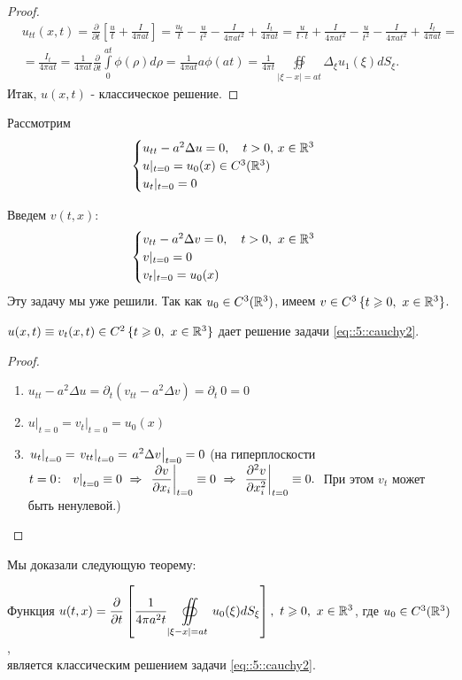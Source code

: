 \documentclass[../main.tex]{subfiles}
\begin{document}
\begin{proof}
\begin{equation*}
\begin{split}
&u_{tt}(x, t)=\frac{\partial}{\partial t}\left[\frac{u}{t}+\frac{I}{4\pi at} \right]=\frac{u_t}{t}-\frac{u}{t^2}-\frac{I}{4\pi at^2}+\frac{I_t}{4\pi at}=\frac{u}{t\cdot t}+\frac{I}{4\pi at^2}-\frac{u}{t^2}-\frac{I}{4\pi at^2}+\frac{I_t}{4\pi at}=\\
&=\frac{I_t}{4\pi at}=\frac{1}{4\pi at}\frac{\partial}{\partial t}\int\limits_0^{at}\phi (\rho )d\rho = \frac{1}{4\pi at}a\phi(at)=\frac{1}{4\pi t}\oiint\limits_{|\xi - x|=at}\Delta_{\xi}u_1(\xi )dS_{\xi}.
\end{split}
\end{equation*}
Итак, $u(x, t)$ - классическое решение.
\end{proof}

Рассмотрим
\begin{equation}
\begin{cases}
  u_{tt}-a^2\Delta u=0,\quad t>0,\, x\in \mathbb{R}^3\\
  u|_{t=0}=u_0(x) \in C^3(\mathbb{R}^3)\\
  u_t|_{t=0}=0
\end{cases}
\label{eq::5::cauchy2}
\end{equation}

Введем $v(t, x)$:
\[
\begin{cases}
  v_{tt}-a^2\Delta v=0,\quad t>0,\ x\in \mathbb{R}^3 \\
  v|_{t=0}=0\\ 
  v_t|_{t=0}=u_0(x)
\end{cases}
\]
Эту задачу мы уже решили. Так как $u_0\in C^3(\mathbb{R}^3)$, имеем $v\in C^3\,\{t\geqslant 0,\ x\in\mathbb{R}^3\}$.
\begin{statement}
$u(x, t)\equiv v_t(x, t)\in C^2\,\{t\geqslant 0,\ x\in\mathbb{R}^3 \}$ дает решение задачи \eqref{eq::5::cauchy2}.
\end{statement}
\begin{proof}$\ $
\begin{enumerate}
\item $u_{tt} - a^2 \Delta u = \partial_t (v_{tt} - a^2 \Delta v) = \partial_t\: 0 = 0$
\item $\left. u\right|_{t=0}=\left. v_t\right|_{t=0}=u_0(x)$
\item $\left. u_t\right|_{t=0} = \left. v_{tt}\right|_{t=0}=\left. a^2 \Delta v\right|_{t=0}=0$ (на гиперплоскости $t=0\colon\ \while{v}{t=0} \equiv 0\ \Rightarrow\ \while{\pd{v}{x_i}}{t=0} \equiv 0\ \Rightarrow\ \while{\pdd{v}{x_i}}{t=0} \equiv 0.\;$ При этом $v_t$ может быть ненулевой.)
\end{enumerate}
\end{proof}
Мы доказали следующую теорему:
\begin{theorem}
Функция $u(t,x)=\dfrac{\partial}{\partial t}\left[\dfrac{1}{4\pi a^2t}\displaystyle\oiint\limits_{|\xi -x|=at}u_0(\xi )dS_{\xi } \right],\ t\geqslant 0,\ x\in\mathbb{R}^3$, где $u_0\in C^3(\mathbb{R}^3)$, \\[1em]
является классическим решением задачи \eqref{eq::5::cauchy2}. 
\end{theorem}
\end{document}
